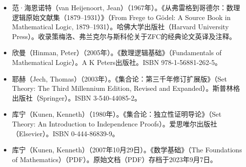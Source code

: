 \begin{itemize}
\item 范·海恩诺特（van Heijenoort, Jean）（1967年）。《从弗雷格到哥德尔：数理逻辑原始文献集（1879–1931）》（From Frege to Gödel: A Source Book in Mathematical Logic, 1879–1931）。哈佛大学出版社（Harvard University Press）。收录策梅洛、弗兰克尔与斯科伦关于ZFC的经典论文英译及注释。
\item 欣曼（Hinman, Peter）（2005年）。《数理逻辑基础》（Fundamentals of Mathematical Logic）。A K Peters出版社。ISBN 978-1-56881-262-5。
\item 耶赫（Jech, Thomas）（2003年）。《集合论：第三千年修订扩展版》（Set Theory: The Third Millennium Edition, Revised and Expanded）。斯普林格出版社（Springer）。ISBN 3-540-44085-2。
\item 库宁（Kunen, Kenneth）（1980年）。《集合论：独立性证明导论》（Set Theory: An Introduction to Independence Proofs）。爱思唯尔出版社（Elsevier）。ISBN 0-444-86839-9。
\item 库宁（Kunen, Kenneth）（2007年10月29日）。《数学基础》（The Foundations of Mathematics）（PDF）。原始文档（PDF）存档于2023年9月7日。
\end{itemize}
